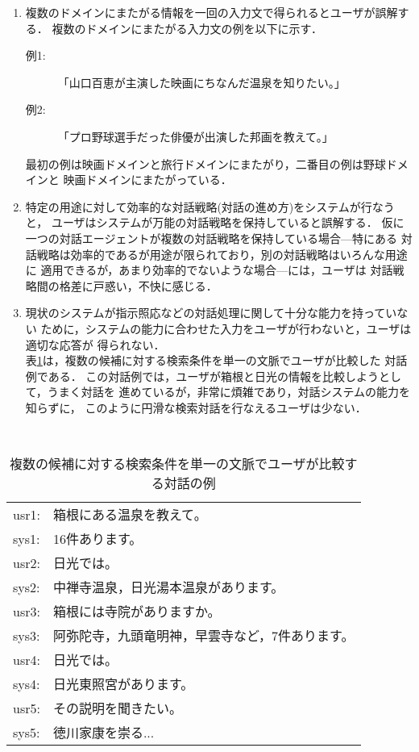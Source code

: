 \begin{enumerate}
\item 複数のドメインにまたがる情報を一回の入力文で得られるとユーザが誤解する．
複数のドメインにまたがる入力文の例を以下に示す．
\begin{description}
\item[例1:] 「山口百恵が主演した映画にちなんだ温泉を知りたい。」
\item[例2:] 「プロ野球選手だった俳優が出演した邦画を教えて。」
\end{description}
最初の例は映画ドメインと旅行ドメインにまたがり，二番目の例は野球ドメインと
映画ドメインにまたがっている．
\item 特定の用途に対して効率的な対話戦略(対話の進め方)をシステムが行なうと，
ユーザはシステムが万能の対話戦略を保持していると誤解する．
仮に一つの対話エージェントが複数の対話戦略を保持している場合---特にある
対話戦略は効率的であるが用途が限られており，別の対話戦略はいろんな用途に
適用できるが，あまり効率的でないような場合---には，ユーザは
対話戦略間の格差に戸惑い，不快に感じる．
\item 現状のシステムが指示照応などの対話処理に関して十分な能力を持っていない
ために，システムの能力に合わせた入力をユーザが行わないと，ユーザは適切な応答が
得られない．\\
表\ref{tab:compare}は，複数の候補に対する検索条件を単一の文脈でユーザが比較した
対話例である．
この対話例では，ユーザが箱根と日光の情報を比較しようとして，うまく対話を
進めているが，非常に煩雑であり，対話システムの能力を知らずに，
このように円滑な検索対話を行なえるユーザは少ない．
\end{enumerate}
\begin{table}[htp]
\caption{複数の候補に対する検索条件を単一の文脈でユーザが比較する対話の例}
\label{tab:compare}
\bigskip
\centering \tt
\begin{tabular}{ll}
\hline\hline
usr1: & 箱根にある温泉を教えて。\\
sys1: & 16件あります。\\
usr2: & 日光では。\\
sys2: & 中禅寺温泉，日光湯本温泉があります。\\
usr3: & 箱根には寺院がありますか。\\
sys3: & 阿弥陀寺，九頭竜明神，早雲寺など，7件あります。\\
usr4: & 日光では。\\
sys4: & 日光東照宮があります。\\
usr5: & その説明を聞きたい。\\
sys5: & 徳川家康を崇る...\\
\hline\hline
\end{tabular}
\end{table}

